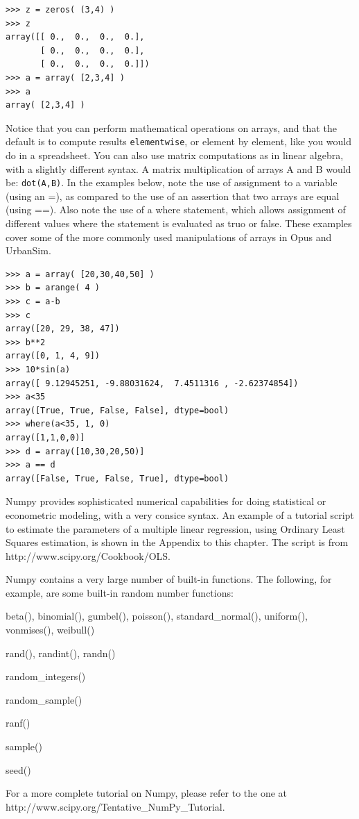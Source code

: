 \begin{verbatim}
>>> z = zeros( (3,4) )
>>> z
array([[ 0.,  0.,  0.,  0.],
       [ 0.,  0.,  0.,  0.],
       [ 0.,  0.,  0.,  0.]])
>>> a = array( [2,3,4] )
>>> a
array( [2,3,4] )
\end{verbatim}

Notice that you can perform mathematical operations on arrays, and that the default is to compute results \verb#elementwise#, or element by element, like you would do in a spreadsheet.  You can also use matrix computations as in linear algebra, with a slightly different syntax.   A matrix multiplication of arrays A and B would be: \verb#dot(A,B)#.  In the examples below, note the use of assignment to a variable (using an =), as compared to the use of an assertion that two arrays are equal (using ==). Also note the use of a where statement, which allows assignment of different values where the statement is evaluated as truo or false.  These examples cover some of the more commonly used manipulations of arrays in Opus and UrbanSim.

\begin{verbatim}
>>> a = array( [20,30,40,50] )
>>> b = arange( 4 )
>>> c = a-b
>>> c
array([20, 29, 38, 47])
>>> b**2
array([0, 1, 4, 9])
>>> 10*sin(a)
array([ 9.12945251, -9.88031624,  7.4511316 , -2.62374854])
>>> a<35
array([True, True, False, False], dtype=bool)
>>> where(a<35, 1, 0)
array([1,1,0,0)]
>>> d = array([10,30,20,50)]
>>> a == d
array([False, True, False, True], dtype=bool)
\end{verbatim}

Numpy provides sophisticated numerical capabilities for doing statistical or econometric modeling, with a very consice syntax.  An example of a tutorial script to estimate  the parameters of a multiple linear regression, using Ordinary Least Squares estimation, is shown in the Appendix to this chapter.  The script is from http://www.scipy.org/Cookbook/OLS.



Numpy contains a very large number of built-in functions. The following, for example, are some built-in random number functions:

\squishlist
\item beta(), binomial(), gumbel(), poisson(), standard\_normal(), uniform(), vonmises(), weibull()
\item rand(), randint(), randn()
\item random\_integers()
\item random\_sample()
\item ranf()
\item sample()
\item seed()
\squishend

For a more complete tutorial on Numpy, please refer to the one at http://www.scipy.org/Tentative\_NumPy\_Tutorial.
